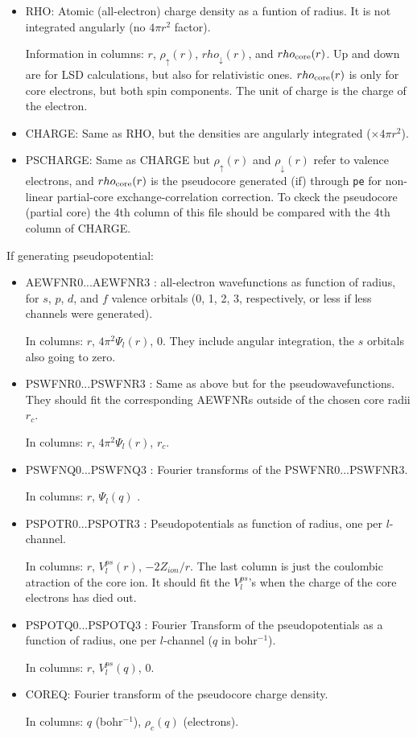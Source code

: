 \documentclass[11pt]{article}
\begin{document}
\begin{itemize}
\item
RHO: Atomic (all-electron) charge density as a funtion of radius.
It is not integrated angularly (no $4 \pi r^2$ factor). 

Information
in columns: $r$, $\rho_{\uparrow}(r)$, $rho_{\downarrow}(r)$, and 
$rho_{\rm core}(r)$. Up and down are for LSD calculations, but also 
for relativistic ones. $rho_{\rm core}(r)$ is only for core electrons, 
but both spin components. The unit of charge is the charge of the electron.

\item
CHARGE: Same as RHO, but the densities are angularly integrated ($\times 4 
\pi r^2$).

\item
PSCHARGE: Same as CHARGE but $\rho_{\uparrow}(r)$ and $\rho_{\downarrow}(r)$ 
refer to valence electrons, and $rho_{\rm core}(r)$ is the  pseudocore 
generated (if) through {\tt pe} for non-linear partial-core 
exchange-correlation correction.
To ckeck the pseudocore (partial core) the 4th column of this file
should be compared with the 4th column of CHARGE.
\end{itemize}

If generating pseudopotential:
\begin{itemize}
\item
AEWFNR0...AEWFNR3 : all-electron wavefunctions as function of radius,
for $s$, $p$, $d$, and $f$ valence orbitals (0, 1, 2, 3, respectively,
or less if less channels were generated).

In columns: $r$, $4 \pi^2 \Psi_l(r)$, 0.  
They include angular integration, the $s$ orbitals also going to zero.

\item
PSWFNR0...PSWFNR3 : Same as above but for the pseudowavefunctions.
They should fit the corresponding AEWFNRs outside of the chosen 
core radii $r_c$. 

In columns: $r$, $4 \pi^2 \Psi_l(r)$, $r_c$.
       
\item
PSWFNQ0...PSWFNQ3 : Fourier transforms of the PSWFNR0...PSWFNR3.

In columns: $r$, $\Psi_l(q)$ .

\item
PSPOTR0...PSPOTR3 : Pseudopotentials as function of radius, 
one per $l$-channel.

In columns: $r$, $V_l^{ps}(r)$, $-2 Z_{ion}/r$. The last column is just 
the coulombic atraction of the core ion. It should fit the $V_l^{ps}$'s 
when the charge of the core electrons has died out. 

\item
PSPOTQ0...PSPOTQ3 : Fourier Transform of the pseudopotentials as a function 
of radius, one per $l$-channel ($q$ in bohr$^{-1}$).

In columns: $r$, $V_l^{ps}(q)$, 0.

\item
COREQ: Fourier transform of the pseudocore charge density.

In columns: $q$ (bohr$^{-1}$), $\rho_c(q)$ (electrons).
\end{itemize}
\end{document}
